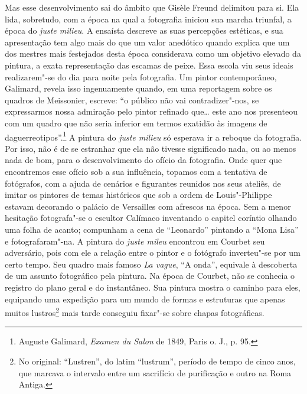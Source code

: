 Mas esse desenvolvimento sai do âmbito que Gisèle Freund delimitou
para si. Ela lida, sobretudo, com a época na qual a fotografia iniciou
sua marcha triunfal, a época do \emph{juste milieu}. A ensaísta
descreve as suas percepções estéticas, e sua
apresentação tem algo mais do que um valor anedótico quando explica que
um dos mestres mais festejados desta época considerava como um objetivo
elevado da pintura, a exata representação das escamas de peixe. Essa
escola viu seus ideais realizarem"-se do dia para noite pela fotografia.
Um pintor contemporâneo, Galimard, revela isso ingenuamente quando, em
uma reportagem sobre os quadros de Meissonier, escreve: ``o público não
vai contradizer"-nos, se expressarmos nossa admiração pelo pintor
refinado que\ldots{} este ano nos presenteou com um quadro que não seria
inferior em termos exatidão às imagens de daguerreotipos''.\footnote{Auguste Galimard,
  \emph{Examen du Salon} de 1849, Paris o. J., p. 95.} A pintura
do \emph{juste milieu} só esperava ir a reboque da
fotografia. Por isso, não é de se estranhar que ela não tivesse
significado nada, ou ao menos nada de bom, para o desenvolvimento do
ofício da fotografia. Onde quer que encontremos esse ofício sob a sua
influência, topamos com a tentativa de fotógrafos, com a ajuda de
cenários e figurantes reunidos nos seus ateliês, de imitar os
pintores de temas históricos que sob a ordem de Louis"-Philippe estavam decorando
o palácio de Versailles com afrescos na época. Sem a menor hesitação fotografa"-se o
escultor Calímaco inventando o capitel coríntio olhando
uma folha de acanto; compunham a cena de ``Leonardo'' pintando a ``Mona
Lisa'' e fotografaram"-na. A pintura do \emph{juste mileu} encontrou em
Courbet seu adversário, pois com ele a relação entre o pintor e o fotógrafo
inverteu"-se por um certo tempo. Seu quadro mais famoso \emph{La vague},
``A onda'', equivale à descoberta de um assunto fotográfico pela
pintura. Na época de Courbet, não se conhecia o registro do plano geral
e do instantâneo. Sua pintura mostra o caminho para eles, equipando uma
expedição para um mundo de formas e estruturas que apenas muitos
lustros\footnote{No original: ``Lustren'', do latim ``lustrum'',
  período de tempo de cinco anos, que marcava o intervalo entre um
  sacrifício de purificação e outro na Roma Antiga. \versal{[N. T.]}} mais tarde
conseguiu fixar"-se sobre chapas fotográficas.


